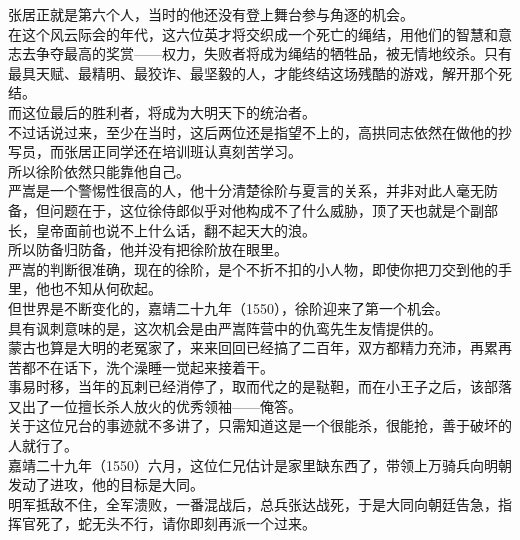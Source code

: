\begin{multicols}{\theparacolNo}
张居正就是第六个人，当时的他还没有登上舞台参与角逐的机会。\\

在这个风云际会的年代，这六位英才将交织成一个死亡的绳结，用他们的智慧和意志去争夺最高的奖赏——权力，失败者将成为绳结的牺牲品，被无情地绞杀。只有最具天赋、最精明、最狡诈、最坚毅的人，才能终结这场残酷的游戏，解开那个死结。\\

而这位最后的胜利者，将成为大明天下的统治者。\\

不过话说过来，至少在当时，这后两位还是指望不上的，高拱同志依然在做他的抄写员，而张居正同学还在培训班认真刻苦学习。\\

所以徐阶依然只能靠他自己。\\

严嵩是一个警惕性很高的人，他十分清楚徐阶与夏言的关系，并非对此人毫无防备，但问题在于，这位徐侍郎似乎对他构成不了什么威胁，顶了天也就是个副部长，皇帝面前也说不上什么话，翻不起天大的浪。\\

所以防备归防备，他并没有把徐阶放在眼里。\\

严嵩的判断很准确，现在的徐阶，是个不折不扣的小人物，即使你把刀交到他的手里，他也不知从何砍起。\\

但世界是不断变化的，嘉靖二十九年（1550），徐阶迎来了第一个机会。\\

具有讽刺意味的是，这次机会是由严嵩阵营中的仇鸾先生友情提供的。\\

蒙古也算是大明的老冤家了，来来回回已经搞了二百年，双方都精力充沛，再累再苦都不在话下，洗个澡睡一觉起来接着干。\\

事易时移，当年的瓦剌已经消停了，取而代之的是鞑靼，而在小王子之后，该部落又出了一位擅长杀人放火的优秀领袖——俺答。\\

关于这位兄台的事迹就不多讲了，只需知道这是一个很能杀，很能抢，善于破坏的人就行了。\\

嘉靖二十九年（1550）六月，这位仁兄估计是家里缺东西了，带领上万骑兵向明朝发动了进攻，他的目标是大同。\\

明军抵敌不住，全军溃败，一番混战后，总兵张达战死，于是大同向朝廷告急，指挥官死了，蛇无头不行，请你即刻再派一个过来。\\


\end{multicols}
